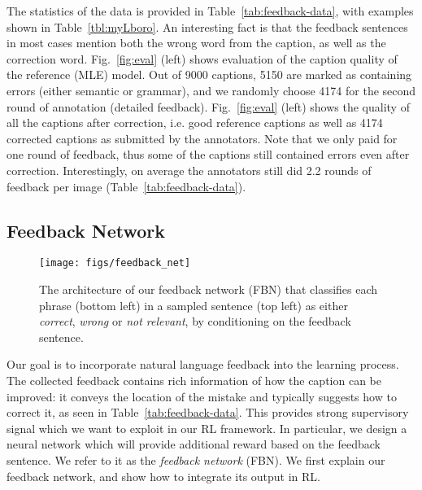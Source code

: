 The statistics of the data is provided in Table~\ref{tab:feedback-data}, with examples shown in Table~\ref{tbl:myLboro}. An interesting fact is that the feedback sentences in most cases mention both the wrong word from the caption, as well as the correction word. Fig.~\ref{fig:eval} (left) shows evaluation of the caption quality of the reference (MLE) model. Out of 9000 captions, 5150 are marked as containing errors (either semantic or grammar), and we randomly choose 4174 for the second round of annotation (detailed feedback). Fig.~\ref{fig:eval} (left) shows the quality of all the captions after correction, i.e. good reference captions as well as 4174 corrected captions as submitted by the annotators. Note that we only paid for one round of feedback, thus some of the captions still contained errors even after correction. Interestingly, on average the annotators still did 2.2 rounds of feedback per image (Table~\ref{tab:feedback-data}).

\vspace{-2mm}
\subsection{Feedback Network}
\label{sec:feedbacknet}
 \vspace{-1mm}

\begin{figure}[t!]
 \vspace{-1mm}
\centering
  \texttt{[image: figs/feedback\_net]}
  \vspace{-1mm}
  \caption{\small The architecture of our feedback network (FBN) that classifies each phrase (bottom left) in a sampled sentence (top left) as either \emph{correct}, \emph{wrong} or \emph{not relevant}, by conditioning on the feedback sentence.}
  \label{fig:feedbacknet}
  \vspace{-2mm}
\end{figure}

Our goal is to incorporate natural language feedback into the learning process. The collected feedback contains rich information of how the caption can be improved: it conveys the location of the mistake and typically suggests how to correct it, as seen in Table~\ref{tab:feedback-data}. This provides strong supervisory signal which we want to exploit in our RL framework. %
In particular, we design a neural network which will provide additional reward based on the feedback sentence. We refer to it as the \emph{feedback network} (FBN). We first explain our feedback network, and show how to integrate its output in RL.

